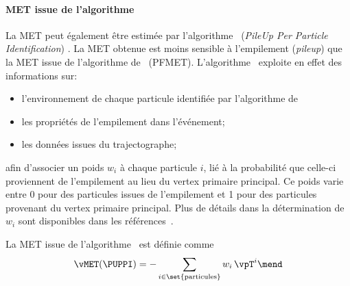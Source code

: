 \paragraph{MET issue de l'algorithme \PUPPI}
La MET peut également être estimée par l'algorithme \PUPPI\ (\emph{PileUp Per Particle Identification}) \cite{PUPPI}.
La \og \PUPPI MET \fg{} obtenue est moins sensible à l'empilement (\emph{pileup}) que la MET issue de l'algorithme de \PF\ (PFMET).
L'algorithme \PUPPI\ exploite en effet des informations sur:
\begin{itemize}
\item l'environnement de chaque particule identifiée par l'algorithme de \PF\;
\item les propriétés de l'empilement dans l'événement;
\item les données issues du trajectographe;
\end{itemize}
afin d'associer un poids $w_i$ à chaque particule $i$, lié à la probabilité que celle-ci proviennent de l'empilement au lieu du vertex primaire principal.
Ce poids varie entre
\num{0} pour des particules issues de l'empilement
et
\num{1} pour des particules provenant du vertex primaire principal.
Plus de détails dans la détermination de $w_i$ sont disponibles dans les références~\cite{CMS-PAS-JME-17-001,PUPPI}.
\par La MET issue de l'algorithme \PUPPI\ est définie comme
\begin{equation}
\vMET(\text{\PUPPI}) = -\sum_{i\in\set{\text{particules}}} w_i\,\vpT^{i}
\mend
\end{equation}